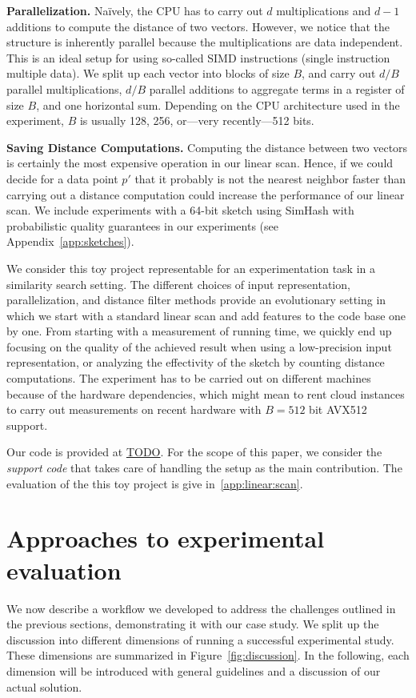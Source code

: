 \documentclass{llncs}
\newcommand{\myparagraph}[1]{\noindent \textbf{#1}}
\begin{document}
\myparagraph{Parallelization.}
Naïvely, the CPU has to carry out $d$ multiplications and $d-1$ additions to compute the distance of two vectors.
However, we notice that the structure is inherently parallel because the multiplications are data independent. This is an ideal setup for using so-called SIMD instructions (single instruction multiple data). 
We split up each vector into blocks of size $B$, and carry out $d/B$ parallel multiplications, $d/B$ parallel additions to aggregate terms in a register of size $B$, and one horizontal sum. 
Depending on the CPU architecture used in the experiment, $B$ is usually 128, 256, or---very recently---512 bits.

\myparagraph{Saving Distance Computations.} Computing the distance 
between two vectors is certainly the most expensive operation in our linear scan. 
Hence, if we could decide for a data point $p'$ that it probably is not the nearest neighbor faster than carrying out a distance computation could increase the performance of our linear scan. 
We include experiments with a 64-bit sketch using SimHash with probabilistic quality guarantees in our experiments (see Appendix~\ref{app:sketches}).

\medskip

We consider this toy project representable for an experimentation task in a similarity search setting. 
The different choices of input representation, parallelization, and distance filter methods provide an evolutionary setting in which we start with a standard linear scan and add features to the code base one by one. 
From starting with a measurement of running time, we quickly end up focusing on the quality of the achieved result when using a low-precision input representation, or analyzing the effectivity of the sketch by counting distance computations.
The experiment has to be carried out on different machines because of the hardware dependencies, which might mean to rent cloud instances to carry out measurements on recent hardware with $B = 512$ bit AVX512 support. 

Our code is provided at \url{TODO}. For the scope of this paper, we consider the \emph{support code} that takes care of handling the setup as the main contribution. The evaluation of the this toy project is give in~\ref{app:linear:scan}.

\section{Approaches to experimental evaluation}
We now describe a workflow we developed to address the challenges outlined
in the previous sections, demonstrating it with our case study.
We split up the discussion into different dimensions of running 
a successful experimental study. 
These dimensions are summarized in Figure~\ref{fig:discussion}. 
In the following, each dimension will be introduced with general
guidelines and a discussion of our actual solution. 
\end{document}
